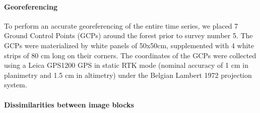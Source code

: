 \documentclass[remotesensing,article,submit,moreauthors,pdftex,12pt,a4paper]{mdpi} %
\begin{document}
\paragraph{Georeferencing}

To perform an accurate georeferencing of the entire time series, we placed 7 Ground Control Points (GCPs) around the forest prior to survey number 5. The GCPs were materialized by white panels of 50x50cm, supplemented with 4 white strips of 80 cm long on their corners. 
The coordinates of the GCPs were collected using a Leica GPS1200 GPS in static RTK mode (nominal accuracy of 1 cm in planimetry and 1.5 cm in altimetry) under the Belgian Lambert 1972 projection system.

\paragraph{Dissimilarities between image blocks}
\end{document}
